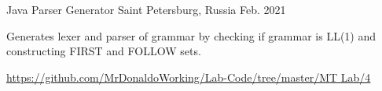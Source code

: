 \begin{cventries}
  \cventry
    {Java}%
    {Parser Generator} %
    {Saint Petersburg, Russia} %
    {Feb. 2021} %
    {
      \begin{cvitems} %
        \item {Generates lexer and parser of grammar by checking if grammar is LL(1) and constructing FIRST and FOLLOW sets.}
        \item {\url {https://github.com/MrDonaldoWorking/Lab-Code/tree/master/MT Lab/4}}
      \end{cvitems}
    }

\end{cventries}
